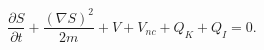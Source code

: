 \begin{equation}
\frac{\partial S}{\partial t}+\frac{\left(  \nabla S\right)  ^{2}}%
{2m}+V+V_{nc}+Q_{K}+Q_{I}=0.\label{39}%
\end{equation}

